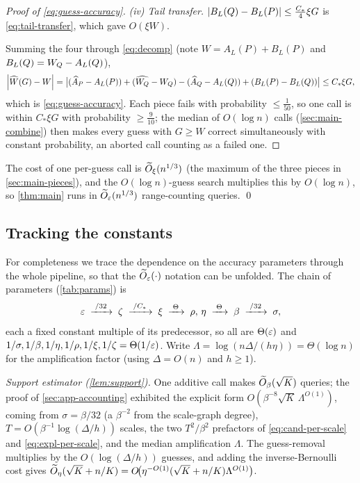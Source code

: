 \begin{proof}[Proof of \eqref{eq:guess-accuracy}]
\emph{(iv) Tail transfer.} $\left|B_L(Q)-B_L(P)\right|\le\tfrac{C_*}4\xi G$ is \eqref{eq:tail-transfer}, which
gave $O(\xi W)$.

Summing the four through \eqref{eq:decomp} (note $W=A_L(P)+B_L(P)$ and $B_L(Q)=W_Q-A_L(Q)$),
\[
  \left|\widehat W(G)-W\right|=\bigl|(\widehat A_P-A_L(P))+(\widehat{W_Q}-W_Q)-(\widehat A_Q-A_L(Q))
    +(B_L(P)-B_L(Q))\bigr|\le C_*\xi G,
\]
which is \eqref{eq:guess-accuracy}. Each piece fails with probability $\le\tfrac1{50}$, so one call is
within $C_*\xi G$ with probability $\ge\tfrac{9}{10}$; the median of $O(\log n)$ calls (\cref{sec:main-combine})
then makes every guess with $G\ge W$ correct simultaneously with constant probability, an aborted call
counting as a failed one.
\end{proof}

The cost of one per-guess call is $\widetilde{O}_\xi(n^{1/3})$ (the maximum of the three pieces in
\cref{sec:main-pieces}), and the $O(\log n)$-guess search multiplies this by $O(\log n)$, so
\cref{thm:main} runs in $\widetilde{O}_\varepsilon(n^{1/3})$ range-counting queries. \qed

\subsection{Tracking the constants}\label{sec:app-constants}

For completeness we trace the dependence on the accuracy parameters through the whole pipeline, so that
the $\widetilde{O}_\varepsilon(\cdot)$ notation can be unfolded. The chain of parameters (\cref{tab:params}) is
\[
  \varepsilon\;\xrightarrow{\;/32\;}\;\zeta\;\xrightarrow{\;/C_*\;}\;\xi\;\xrightarrow{\;\Theta\;}\;
  \rho,\,\eta\;\xrightarrow{\;\Theta\;}\;\beta\;\xrightarrow{\;/32\;}\;\sigma,
\]
each a fixed constant multiple of its predecessor, so all are $\Theta(\varepsilon)$ and $1/\sigma,1/\beta,1/\eta,
1/\rho,1/\xi,1/\zeta=\Theta(1/\varepsilon)$. Write $\Lambda=\log(n\Delta/(h\eta))=\Theta(\log n)$ for the
amplification factor (using $\Delta=O(n)$ and $h\ge 1$).

\emph{Support estimator (\cref{lem:support}).} One additive call makes $\widetilde{O}_\beta(\sqrt K)$ queries; the
proof of \cref{sec:app-accounting} exhibited the explicit form $O(\beta^{-8}\sqrt K\,\Lambda^{O(1)})$,
coming from $\sigma=\beta/32$ (a $\beta^{-2}$ from the scale-graph degree), $T=O(\beta^{-1}\log(\Delta/h))$
scales, the two $T^2/\beta^2$ prefactors of \eqref{eq:cand-per-scale} and \eqref{eq:expl-per-scale}, and
the median amplification $\Lambda$. The guess-removal multiplies by the $O(\log(\Delta/h))$ guesses, and
adding the inverse-Bernoulli cost gives $\widetilde{O}_\eta(\sqrt K+n/K)=O\!\bigl(\eta^{-O(1)}(\sqrt K+n/K)
\Lambda^{O(1)}\bigr)$.


